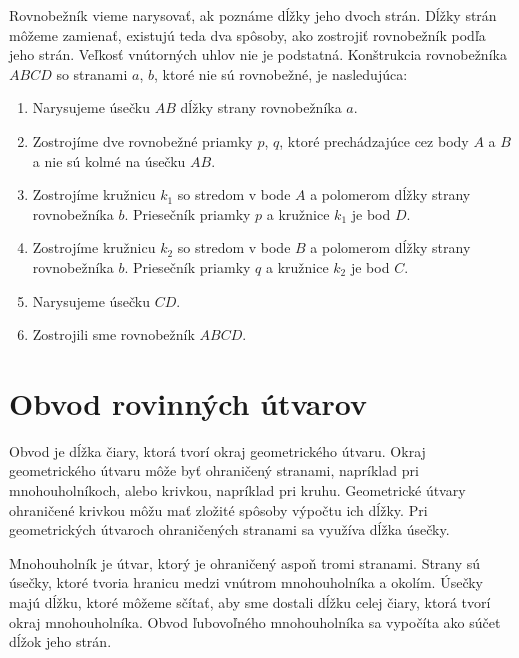 \documentclass{report}
\begin{document}
Rovnobežník vieme narysovať, ak poznáme dĺžky jeho dvoch strán. Dĺžky strán môžeme zamienať, existujú teda dva spôsoby, ako zostrojiť rovnobežník podľa jeho strán. Veľkosť vnútorných uhlov nie je podstatná. Konštrukcia rovnobežníka \(ABCD\) so stranami \(a\), \(b\), ktoré nie sú rovnobežné, je nasledujúca:
\begin{enumerate}[label=\arabic*)]
  \item Narysujeme úsečku \(AB\) dĺžky strany rovnobežníka \(a\).
  \item Zostrojíme dve rovnobežné priamky \(p\), \(q\), ktoré prechádzajúce cez body \(A\) a \(B\) a nie sú kolmé na úsečku \(AB\).
  \item Zostrojíme kružnicu \(k_1\) so stredom v bode \(A\) a polomerom dĺžky strany rovnobežníka \(b\). Priesečník priamky \(p\) a kružnice \(k_1\) je bod \(D\).
  \item Zostrojíme kružnicu \(k_2\) so stredom v bode \(B\) a polomerom dĺžky strany rovnobežníka \(b\). Priesečník priamky \(q\) a kružnice \(k_2\) je bod \(C\).
  \item Narysujeme úsečku \(CD\).
  \item Zostrojili sme rovnobežník \(ABCD\).
\end{enumerate}

\section{Obvod rovinných útvarov}

Obvod je dĺžka čiary, ktorá tvorí okraj geometrického útvaru. Okraj geometrického útvaru môže byť ohraničený stranami, napríklad pri mnohouholníkoch, alebo krivkou, napríklad pri kruhu. Geometrické útvary ohraničené krivkou môžu mať zložité spôsoby výpočtu ich dĺžky. Pri geometrických útvaroch ohraničených stranami sa využíva dĺžka úsečky.

Mnohouholník je útvar, ktorý je ohraničený aspoň tromi stranami. Strany sú úsečky, ktoré tvoria hranicu medzi vnútrom mnohouholníka a okolím. Úsečky majú dĺžku, ktoré môžeme sčítať, aby sme dostali dĺžku celej čiary, ktorá tvorí okraj mnohouholníka. Obvod ľubovoľného mnohouholníka sa vypočíta ako súčet dĺžok jeho strán.
\end{document}
